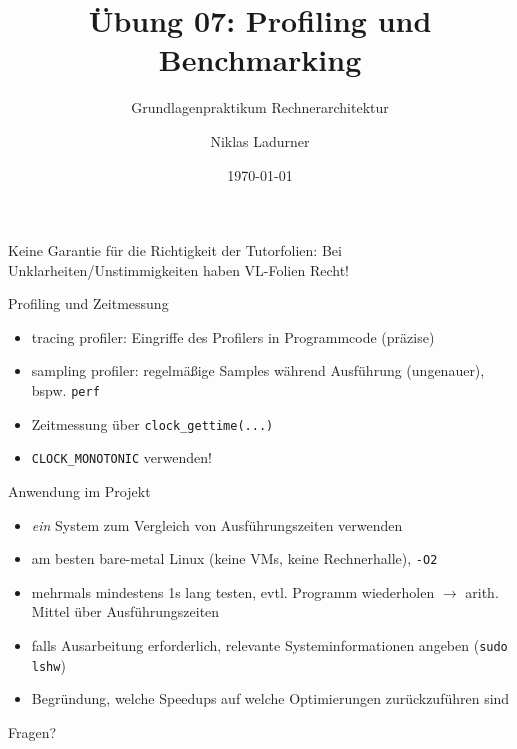 \documentclass[
  german,            %
  aspectratio=169,    %
]{tumbeamer}
\title{Übung 07: Profiling und Benchmarking}
\subtitle{Grundlagenpraktikum Rechnerarchitektur}
\author{Niklas Ladurner}
\institute{\theChairName\\\theDepartmentName\\\theUniversityName}
\date[\today]{\today}
\begin{document}
\maketitle

\begin{frame}[c]{}{}
  \begin{center}
    \LARGE  Keine Garantie für die Richtigkeit der Tutorfolien: Bei Unklarheiten/Unstimmigkeiten
    haben VL-Folien Recht!
  \end{center}
\end{frame}

\begin{frame}[c, fragile]{Profiling und Zeitmessung}{}
  \begin{itemize}
    \item tracing profiler: Eingriffe des Profilers in Programmcode (präzise)
    \item sampling profiler: regelmäßige Samples während Ausführung (ungenauer), bspw. \verb|perf|
    \item Zeitmessung über \verb|clock_gettime(...)|
    \item \verb|CLOCK_MONOTONIC| verwenden!
  \end{itemize}
\end{frame}


\begin{frame}[c, fragile]{Anwendung im Projekt}{}
  \begin{itemize}
    \item \textit{ein} System zum Vergleich von Ausführungszeiten verwenden
    \item am besten bare-metal Linux (keine VMs, keine Rechnerhalle), \verb|-O2|
    \item mehrmals mindestens 1s lang testen, evtl. Programm wiederholen $\rightarrow$ arith. Mittel über Ausführungszeiten
    \item falls Ausarbeitung erforderlich, relevante Systeminformationen angeben (\verb|sudo lshw|)
    \item Begründung, welche Speedups auf welche Optimierungen zurückzuführen sind
  \end{itemize}
\end{frame}

\begin{frame}[c]{}{}
  \begin{center}
    \LARGE Fragen?
  \end{center}
\end{frame}
\end{document}
